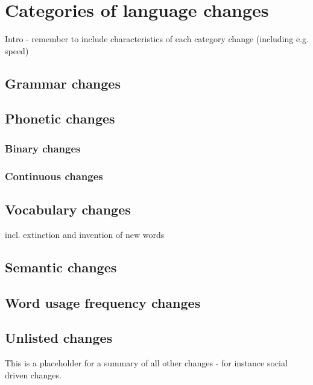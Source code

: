 \section{Categories of language changes}
Intro - remember to include characteristics of each category change (including e.g. speed)

\subsection{Grammar changes}

\subsection{Phonetic changes}

\subsubsection{Binary changes}
\subsubsection{Continuous changes}

\subsection{Vocabulary changes}
incl. extinction and invention of new words

\subsection{Semantic changes}

\subsection{Word usage frequency changes}

\subsection{Unlisted changes}

This is a placeholder for a summary of all other changes - for instance social driven changes.
